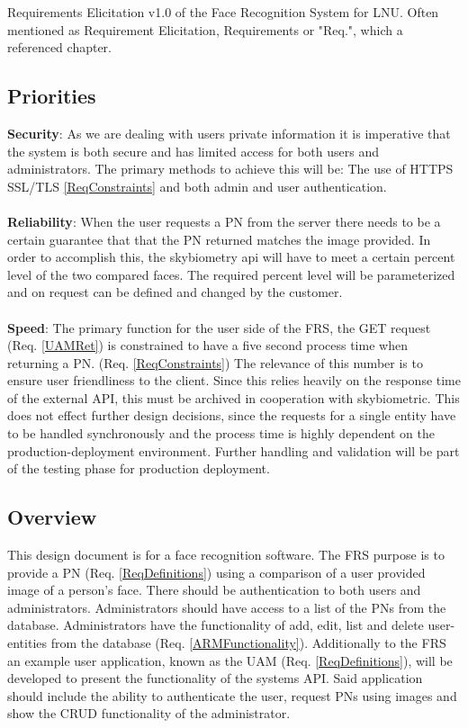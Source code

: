 \documentclass[a4paper,11pt]{article}
\begin{document}
Requirements Elicitation v1.0 of the Face Recognition System for  LNU. Often mentioned as Requirement Elicitation, Requirements or "Req.", which a referenced chapter.


\subsection{Priorities}

\textbf{Security}: As we are dealing with users private information it is imperative that the system is both secure and has limited access for both users and administrators. The primary methods to achieve this will be: The use of HTTPS SSL/TLS \ref{ReqConstraints}  and both admin and user authentication. \\ \\
\noindent
\textbf{Reliability}: When the user requests a PN from the server there needs to be a certain guarantee that that the PN returned matches the image provided. In order to accomplish this, the skybiometry api will have to meet a certain percent level of the two compared faces. The required percent level will be parameterized and on request can be defined and changed by the customer. \\ \\
\noindent
\textbf{Speed}: The primary function for the user side of the FRS, the GET request (Req. \ref{UAMRet}) is constrained to have a five second process time when returning a PN. (Req. \ref{ReqConstraints}) The relevance of this number is to ensure user friendliness to the client.
Since this relies heavily on the response time of the external API, this must be archived in cooperation with skybiometric. This does not effect further design decisions, since the requests for a single entity have to be handled synchronously and the process time is highly dependent on the production-deployment environment. Further handling and validation will be part of the testing phase for production deployment. 
\subsection{Overview}
This design document is for a face recognition software. The FRS purpose is to provide a PN (Req. \ref{ReqDefinitions}) using a comparison of a user provided image of a person's face. There should  be authentication to both users and administrators. Administrators should have access to a list of the PNs from the database. Administrators have the functionality of add, edit, list and delete user-entities from the database (Req. \ref{ARMFunctionality}).
Additionally to the FRS an example user application, known as the UAM (Req. \ref{ReqDefinitions}), will be developed to present the functionality of the systems API. Said application should include the ability to authenticate the user, request PNs using images and show the CRUD functionality of the administrator.
\end{document}
